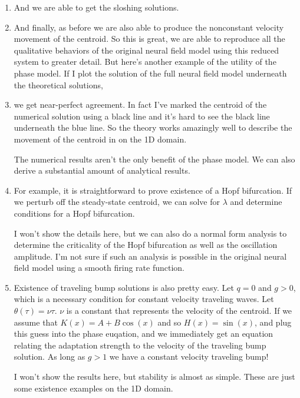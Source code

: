 \documentclass[a4paper,14pt]{article}
\begin{document}
\begin{enumerate}
 \item And we are able to get the sloshing solutions.
 
 \item And finally, as before we are also able to produce the nonconstant velocity movement of the centroid. So this is great, we are able to reproduce all the qualitative behaviors of the original neural field model using this reduced system to greater detail. But here's another example of the utility of the phase model. If I plot the solution of the full neural field model underneath the theoretical solutions,
 
 \item we get near-perfect agreement. In fact I've marked the centroid of the numerical solution using a black line and it's hard to see the black line underneath the blue line. So the theory works amazingly well to describe the movement of the centroid in on the 1D domain.
 
 
 
 The numerical results aren't the only benefit of the phase model. We can also derive a substantial amount of analytical results.
 
 \item For example, it is straightforward to prove existence of a Hopf bifurcation. If we perturb off the steady-state centroid, we can solve for $\lambda$ and determine conditions for a Hopf bifurcation.
 
 I won't show the details here, but we can also do a normal form analysis to determine the criticality of the Hopf bifurcation as well as the oscillation amplitude. I'm not sure if such an analysis is possible in the original neural field model using a smooth firing rate function.
 
 \item Existence of traveling bump solutions is also pretty easy. Let $q=0$ and $g>0$, which is a necessary condition for constant velocity traveling waves. Let $\theta(\tau) = \nu \tau$. $\nu$ is a constant that represents the velocity of the centroid. If we assume that $K(x) = A + B\cos(x)$ and so $H(x) = \sin(x)$, and plug this guess into the phase euqation, and we immediately get an equation relating the adaptation strength to the velocity of the traveling bump solution. As long as $g>1$ we have a constant velocity traveling bump!
 
 I won't show the results here, but stability is almost as simple. These are just some existence examples on the 1D domain.
 

\end{enumerate}
\end{document}
